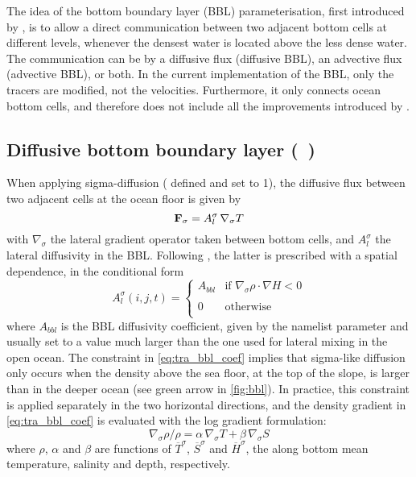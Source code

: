 \documentclass[../main/NEMO_manual]{subfiles}
\begin{document}
The idea of the bottom boundary layer (BBL) parameterisation, first introduced by \citet{Beckmann_Doscher1997},
is to allow a direct communication between two adjacent bottom cells at different levels,
whenever the densest water is located above the less dense water.
The communication can be by a diffusive flux (diffusive BBL), an advective flux (advective BBL), or both.
In the current implementation of the BBL, only the tracers are modified, not the velocities.
Furthermore, it only connects ocean bottom cells, and therefore does not include all the improvements introduced by
\citet{Campin_Goosse_Tel99}.

\subsection{Diffusive bottom boundary layer (\protect{}~)}
\label{subsec:TRA_bbl_diff}

When applying sigma-diffusion ( defined and  set to 1),
the diffusive flux between two adjacent cells at the ocean floor is given by 
\[
  \mathbf{F}_\sigma = A_l^\sigma \, \nabla_\sigma T
\]
with $\nabla_\sigma$ the lateral gradient operator taken between bottom cells, and
$A_l^\sigma$ the lateral diffusivity in the BBL.
Following \citet{Beckmann_Doscher1997}, the latter is prescribed with a spatial dependence,
\ie in the conditional form
\begin{equation}
  \label{eq:tra_bbl_coef}
  A_l^\sigma (i,j,t) =
      \begin{cases}
        A_{bbl} & \text{if~} \nabla_\sigma \rho \cdot \nabla H < 0 \\
        \\
        0      & \text{otherwise} \\
      \end{cases}
\end{equation}
where $A_{bbl}$ is the BBL diffusivity coefficient, given by the namelist parameter  and
usually set to a value much larger than the one used for lateral mixing in the open ocean.
The constraint in \autoref{eq:tra_bbl_coef} implies that sigma-like diffusion only occurs when
the density above the sea floor, at the top of the slope, is larger than in the deeper ocean
(see green arrow in \autoref{fig:bbl}).
In practice, this constraint is applied separately in the two horizontal directions,
and the density gradient in \autoref{eq:tra_bbl_coef} is evaluated with the log gradient formulation: 
\[
  \nabla_\sigma \rho / \rho = \alpha \, \nabla_\sigma T + \beta \, \nabla_\sigma S
\]
where $\rho$, $\alpha$ and $\beta$ are functions of $\overline T^\sigma$, $\overline S^\sigma$ and
$\overline H^\sigma$, the along bottom mean temperature, salinity and depth, respectively.
\end{document}
